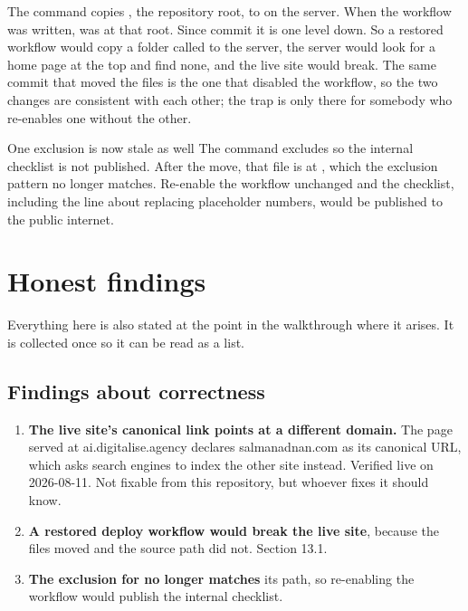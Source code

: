 \documentclass[11pt,a4paper]{article}
\begin{document}
The  command copies , the repository root, to
 on the server. When the workflow was written,
 was at that root. Since commit  it is one level
down. So a restored workflow would copy a folder called
 to the server, the server would look for a home page
at the top and find none, and the live site would break. The same commit that
moved the files is the one that disabled the workflow, so the two changes are
consistent with each other; the trap is only there for somebody who re-enables
one without the other.

\begin{honest}{One exclusion is now stale as well}
The  command excludes  so the internal
checklist is not published. After the move, that file is at
, which the exclusion pattern no
longer matches. Re-enable the workflow unchanged and the checklist, including the
line about replacing placeholder numbers, would be published to the public
internet.
\end{honest}

\section{Honest findings}

Everything here is also stated at the point in the walkthrough where it arises.
It is collected once so it can be read as a list.

\subsection{Findings about correctness}

\begin{enumerate}
\item \textbf{The live site's canonical link points at a different domain.} The
  page served at ai.digitalise.agency declares salmanadnan.com as its canonical
  URL, which asks search engines to index the other site instead. Verified live on
  2026-08-11. Not fixable from this repository, but whoever fixes it should know.
\item \textbf{A restored deploy workflow would break the live site}, because the
  files moved and the  source path did not. Section 13.1.
\item \textbf{The  exclusion for  no longer matches}
  its path, so re-enabling the workflow would publish the internal checklist.
\end{enumerate}
\end{document}
